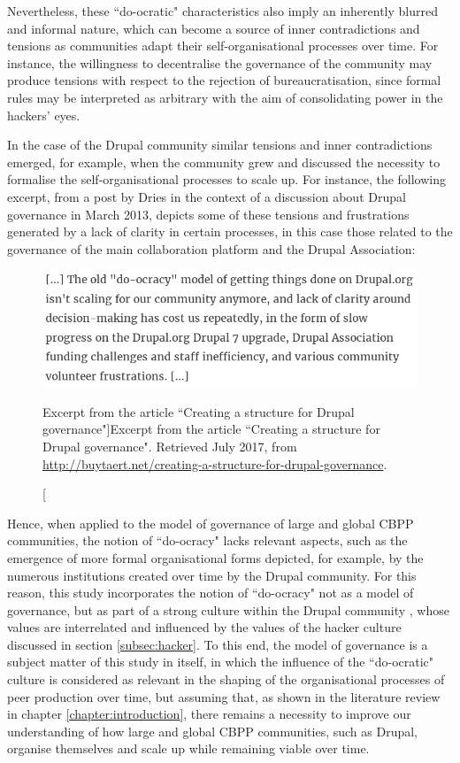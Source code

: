 Nevertheless, these ``do-ocratic" characteristics also imply an inherently blurred and informal nature, which can become a source of inner contradictions and tensions as communities adapt their self-organisational processes over time. For instance, the willingness to decentralise the governance of the community may produce tensions with respect to the rejection of bureaucratisation, since formal rules may be interpreted as arbitrary with the aim of consolidating power in the hackers' eyes.

In the case of the Drupal community similar tensions and inner contradictions emerged, for example, when the community grew and discussed the necessity to formalise the self-organisational processes to scale up. For instance, the following excerpt, from a post by Dries \parencite{do-ocracy01:2016:Online} in the context of a discussion about Drupal governance in March 2013, depicts some of these tensions and frustrations generated by a lack of clarity in certain processes, in this case those related to the governance of the main collaboration platform and the Drupal Association:

\begin{figure}[H]
  \centering
\includegraphics[scale=0.5]{img/quotes_replacement/do-ocracy-dries.png}
\caption[Excerpt from the article ``Creating a structure for Drupal governance"]{Excerpt from the article ``Creating a structure for Drupal governance". Retrieved  July 2017, from \url{http://buytaert.net/creating-a-structure-for-drupal-governance}.}
\label{do-ocracy-dries}
\end{figure}

Hence, when applied to the model of governance of large and global CBPP communities, the notion of ``do-ocracy" lacks relevant aspects, such as the emergence of more formal organisational forms depicted, for example, by the numerous institutions created over time by the Drupal community. For this reason, this study incorporates the notion of ``do-ocracy" not as a model of governance, but as part of a strong culture within the Drupal community \parencite{melanccon2011contributing}, whose values are interrelated and influenced by the values of the hacker culture discussed in section \ref{subsec:hacker}. To this end, the model of governance is a subject matter of this study in itself, in which the influence of the ``do-ocratic" culture is considered as relevant in the shaping of the organisational processes of peer production over time, but assuming that, as shown in the literature review in chapter \ref{chapter:introduction}, there remains a necessity to improve our understanding of how large and global CBPP communities, such as Drupal, organise themselves and scale up while remaining viable over time.

